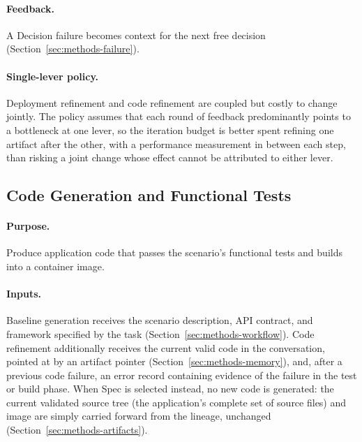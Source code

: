 \paragraph{Feedback.}
A Decision failure becomes context for the next free decision
(Section~\ref{sec:methods-failure}).

\paragraph{Single-lever policy.}
Deployment refinement and code refinement are coupled but costly to change
jointly. The policy assumes that each round of feedback predominantly points
to a bottleneck at one lever, so the iteration budget is better spent
refining one artifact after the other, with a performance measurement in
between each step, than risking a joint change whose effect cannot be
attributed to either lever.


\subsection{Code Generation and Functional Tests}
\label{sec:methods-code}

\paragraph{Purpose.}
Produce application code that passes the scenario's functional tests and
builds into a container image.

\paragraph{Inputs.}
Baseline generation receives the scenario description, API contract, and
framework specified by the task (Section~\ref{sec:methods-workflow}). Code
refinement additionally receives the current valid code in the
conversation, pointed at by an artifact pointer
(Section~\ref{sec:methods-memory}), and, after a previous code failure, an
error record containing evidence of the failure in the test or build phase.
When Spec is selected instead, no new code is generated: the current
validated source tree (the application's complete set of source files) and
image are simply carried forward from the lineage, unchanged
(Section~\ref{sec:methods-artifacts}).

